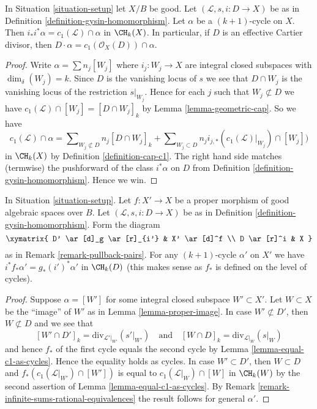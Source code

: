 \begin{lemma}
\label{lemma-support-cap-effective-Cartier}
In Situation \ref{situation-setup} let $X/B$ be good. Let
$(\mathcal{L}, s, i : D \to X)$ be as in
Definition \ref{definition-gysin-homomorphism}. Let $\alpha$ be a
$(k + 1)$-cycle on $X$. Then $i_*i^*\alpha = c_1(\mathcal{L}) \cap \alpha$
in $\CH_k(X)$. In particular, if $D$ is an effective Cartier divisor, then
$D \cdot \alpha = c_1(\mathcal{O}_X(D)) \cap \alpha$.
\end{lemma}

\begin{proof}
Write $\alpha = \sum n_j[W_j]$ where $i_j : W_j \to X$ are integral closed
subspaces with $\dim_\delta(W_j) = k$.
Since $D$ is the vanishing locus of $s$ we see that
$D \cap W_j$ is the vanishing locus
of the restriction $s|_{W_j}$. Hence for each $j$ such that
$W_j \not \subset D$ we have
$c_1(\mathcal{L}) \cap [W_j] = [D \cap W_j]_k$
by Lemma \ref{lemma-geometric-cap}. So we have
$$
c_1(\mathcal{L}) \cap \alpha
=
\sum\nolimits_{W_j \not \subset D} n_j[D \cap W_j]_k
+
\sum\nolimits_{W_j \subset D}
n_j i_{j, *}(c_1(\mathcal{L})|_{W_j}) \cap [W_j])
$$
in $\CH_k(X)$ by Definition \ref{definition-cap-c1}.
The right hand side matches (termwise) the pushforward of the class
$i^*\alpha$ on $D$ from Definition \ref{definition-gysin-homomorphism}.
Hence we win.
\end{proof}

\begin{lemma}
\label{lemma-closed-in-X-gysin}
In Situation \ref{situation-setup}. Let $f : X' \to X$ be a proper morphism
of good algebraic spaces over $B$. Let $(\mathcal{L}, s, i : D \to X)$ be as in
Definition \ref{definition-gysin-homomorphism}.
Form the diagram
$$
\xymatrix{
D' \ar[d]_g \ar[r]_{i'} & X' \ar[d]^f \\
D \ar[r]^i & X
}
$$
as in Remark \ref{remark-pullback-pairs}.
For any $(k + 1)$-cycle $\alpha'$ on $X'$ we have
$i^*f_*\alpha' = g_*(i')^*\alpha'$ in $\CH_k(D)$
(this makes sense as $f_*$ is defined on the level of cycles).
\end{lemma}

\begin{proof}
Suppose $\alpha = [W']$ for some integral closed subspace
$W' \subset X'$. Let $W \subset X$ be the ``image'' of $W'$
as in Lemma \ref{lemma-proper-image}. In case $W' \not \subset D'$,
then $W \not \subset D$ and we see that
$$
[W' \cap D']_k = \text{div}_{\mathcal{L}'|_{W'}}({s'|_{W'}})
\quad\text{and}\quad
[W \cap D]_k = \text{div}_{\mathcal{L}|_W}(s|_W)
$$
and hence $f_*$ of the first cycle equals the second cycle by
Lemma \ref{lemma-equal-c1-as-cycles}. Hence the
equality holds as cycles. In case $W' \subset D'$, then
$W \subset D$ and $f_*(c_1(\mathcal{L}|_{W'}) \cap [W'])$
is equal to $c_1(\mathcal{L}|_W) \cap [W]$ in $\CH_k(W)$ by the second
assertion of Lemma \ref{lemma-equal-c1-as-cycles}.
By Remark \ref{remark-infinite-sums-rational-equivalences}
the result follows for general $\alpha'$.
\end{proof}

